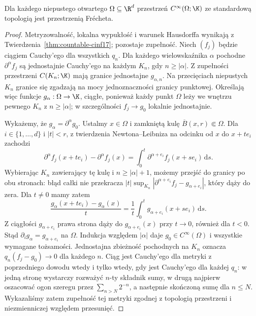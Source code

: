 \begin{twierdzenie}
\label{thm:frechet-cinf17}
Dla każdego niepustego otwartego $\Omega\subseteq\R^d$ przestrzeń
$C^\infty(\Omega;\K)$ ze standardową topologią jest przestrzenią
Frécheta.
\end{twierdzenie}
\begin{proof}
Metryzowalność, lokalna wypukłość i warunek Hausdorffa wynikają
z Twierdzenia~\ref{thm:countable-cinf17}; pozostaje zupełność.
Niech $(f_j)$ będzie ciągiem Cauchy'ego dla wszystkich $q_n$.
Dla każdego wielowskaźnika $\alpha$ pochodne
$\partial^\alpha f_j$ są jednostajnie Cauchy'ego na każdym
$K_n$, gdy $n\ge|\alpha|$. Z zupełności przestrzeni
$C(K_n;\K)$ mają granice jednostajne $g_{\alpha,n}$.
Na przecięciach niepustych $K_n$ granice się zgadzają
na mocy jednoznaczności granicy punktowej. Określają więc
funkcje $g_\alpha:\Omega\to\K$, ciągłe, ponieważ każdy punkt
$\Omega$ leży we wnętrzu pewnego $K_n$ z $n\ge|\alpha|$; w szczególności
$f_j\to g_0$ lokalnie jednostajnie.

Wykażemy, że $g_\alpha=\partial^\alpha g_0$.
Ustalmy $x\in\Omega$ i zamkniętą kulę $\overline B(x,r)\Subset\Omega$.
Dla $i\in\{1,\dots,d\}$ i $|t|<r$, z twierdzenia
Newtona--Leibniza na odcinku od $x$ do $x+te_i$ zachodzi
\[
 \partial^\alpha f_j(x+te_i)-\partial^\alpha f_j(x)
 =\int_0^t\partial^{\alpha+e_i}f_j(x+se_i)\,\mathrm ds.
\]
Wybierając $K_n$ zawierający tę kulę i $n\ge|\alpha|+1$,
możemy przejść do granicy po obu stronach: błąd całki
nie przekracza $|t|\sup_{K_n}|\partial^{\alpha+e_i}f_j-
g_{\alpha+e_i}|$, który dąży do zera. Dla $t\ne0$ mamy zatem
\[
\frac{g_\alpha(x+te_i)-g_\alpha(x)}{t}
=\frac1t\int_0^t g_{\alpha+e_i}(x+se_i)\,\mathrm ds.
\]
Z ciągłości $g_{\alpha+e_i}$ prawa strona dąży do
$g_{\alpha+e_i}(x)$ przy $t\to0$, również dla $t<0$.
Stąd $\partial_i g_\alpha=g_{\alpha+e_i}$ na $\Omega$.
Indukcja względem $|\alpha|$ daje $g_0\in C^\infty(\Omega)$
i wszystkie wymagane tożsamości. Jednostajna zbieżność
pochodnych na $K_n$ oznacza $q_n(f_j-g_0)\to0$ dla każdego $n$.
Ciąg jest Cauchy'ego dla metryki z poprzedniego dowodu
wtedy i tylko wtedy, gdy jest Cauchy'ego dla każdej $q_n$:
w jedną stronę wystarczy rozważyć $n$-ty składnik sumy,
w drugą najpierw oszacować ogon szeregu przez $\sum_{n>N}2^{-n}$,
a następnie skończoną sumę dla $n\le N$.
Wykazaliśmy zatem zupełność tej metryki zgodnej z topologią
przestrzeni i niezmienniczej względem przesunięć.
\end{proof}

